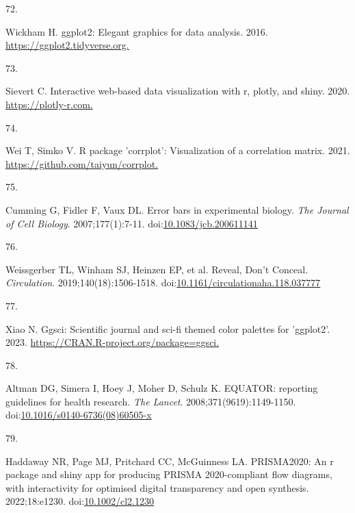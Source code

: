 \documentclass[
]{book}
\newlength{\cslhangindent}
\newlength{\csllabelwidth}
\newlength{\cslentryspacingunit} %
\newenvironment{CSLReferences}[2] %
 {%
  \setlength{\parindent}{0pt}
  \ifodd #1
  \let\oldpar\par
  \def\par{\hangindent=\cslhangindent\oldpar}
  \fi
  \setlength{\parskip}{#2\cslentryspacingunit}
 }%
 {}
\newcommand{\CSLLeftMargin}[1]{\parbox[t]{\csllabelwidth}{#1}}
\newcommand{\CSLRightInline}[1]{\parbox[t]{\linewidth - \csllabelwidth}{#1}\break}
\begin{document}
\begin{CSLReferences}{0}{0}
\leavevmode{}%
\CSLLeftMargin{72. }%
\CSLRightInline{Wickham H. ggplot2: Elegant graphics for data analysis. 2016. \href{https://ggplot2.tidyverse.org}{https://ggplot2.tidyverse.org.}}

\leavevmode{}%
\CSLLeftMargin{73. }%
\CSLRightInline{Sievert C. Interactive web-based data visualization with r, plotly, and shiny. 2020. \href{https://plotly-r.com}{https://plotly-r.com.}}

\leavevmode{}%
\CSLLeftMargin{74. }%
\CSLRightInline{Wei T, Simko V. R package 'corrplot': Visualization of a correlation matrix. 2021. \href{https://github.com/taiyun/corrplot}{https://github.com/taiyun/corrplot.}}

\leavevmode{}%
\CSLLeftMargin{75. }%
\CSLRightInline{Cumming G, Fidler F, Vaux DL. Error bars in experimental biology. \emph{The Journal of Cell Biology}. 2007;177(1):7-11. doi:\href{https://doi.org/10.1083/jcb.200611141}{10.1083/jcb.200611141}}

\leavevmode{}%
\CSLLeftMargin{76. }%
\CSLRightInline{Weissgerber TL, Winham SJ, Heinzen EP, et al. Reveal, Don{'}t Conceal. \emph{Circulation}. 2019;140(18):1506-1518. doi:\href{https://doi.org/10.1161/circulationaha.118.037777}{10.1161/circulationaha.118.037777}}

\leavevmode{}%
\CSLLeftMargin{77. }%
\CSLRightInline{Xiao N. Ggsci: Scientific journal and sci-fi themed color palettes for 'ggplot2'. 2023. \href{https://CRAN.R-project.org/package=ggsci}{https://CRAN.R-project.org/package=ggsci.}}

\leavevmode{}%
\CSLLeftMargin{78. }%
\CSLRightInline{Altman DG, Simera I, Hoey J, Moher D, Schulz K. EQUATOR: reporting guidelines for health research. \emph{The Lancet}. 2008;371(9619):1149-1150. doi:\href{https://doi.org/10.1016/s0140-6736(08)60505-x}{10.1016/s0140-6736(08)60505-x}}

\leavevmode{}%
\CSLLeftMargin{79. }%
\CSLRightInline{Haddaway NR, Page MJ, Pritchard CC, McGuinness LA. PRISMA2020: An r package and shiny app for producing PRISMA 2020-compliant flow diagrams, with interactivity for optimised digital transparency and open synthesis. 2022;18:e1230. doi:\href{https://doi.org/10.1002/cl2.1230}{10.1002/cl2.1230}}


\end{CSLReferences}
\end{document}
